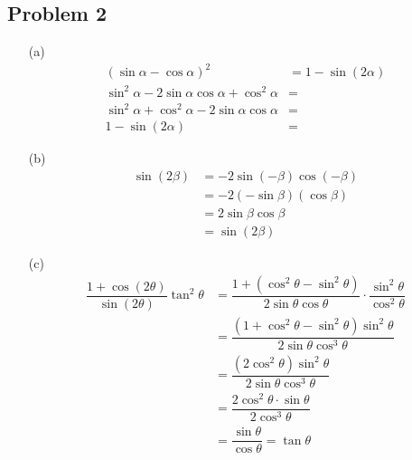 \documentclass[12pt]{article}
\begin{document}
\subsection*{Problem 2}
\begin{enumerate}
    \item[(a)] \begin{align*}
        (\sin \alpha - \cos \alpha)^2 &= 1 - \sin(2\alpha) \\
        \sin^2 \alpha - 2\sin \alpha \cos \alpha + \cos^2 \alpha &= \\
        \sin^2 \alpha + \cos^2 \alpha - 2\sin \alpha \cos \alpha &= \\
        1 - \sin(2\alpha) &=
    \end{align*}

    \item[(b)] \begin{align*}
        \sin(2\beta) &= -2\sin(-\beta)\cos(-\beta) \\
        &= -2(-\sin \beta)(\cos \beta) \\
        &= 2\sin \beta \cos \beta \\
        &= \sin(2\beta)
    \end{align*}

    \item[(c)] \begin{align*}
    \dfrac{1+\cos(2\theta)}{\sin(2\theta)}\tan^2\theta &= \dfrac{1 + (\cos^2\theta - \sin^2\theta)}{2\sin\theta\cos\theta} \cdot \dfrac{\sin^2\theta}{\cos^2\theta} \\
    &= \dfrac{(1 + \cos^2\theta - \sin^2\theta)\sin^2\theta}{2\sin\theta\cos^3\theta} \\
    &= \dfrac{(2\cos^2\theta)\sin^2\theta}{2\sin\theta\cos^3\theta} \\
    &= \dfrac{2\cos^2\theta \cdot \sin\theta}{2\cos^3\theta} \\
    &= \dfrac{\sin\theta}{\cos\theta} = \tan\theta
\end{align*}
\end{enumerate}
\end{document}
